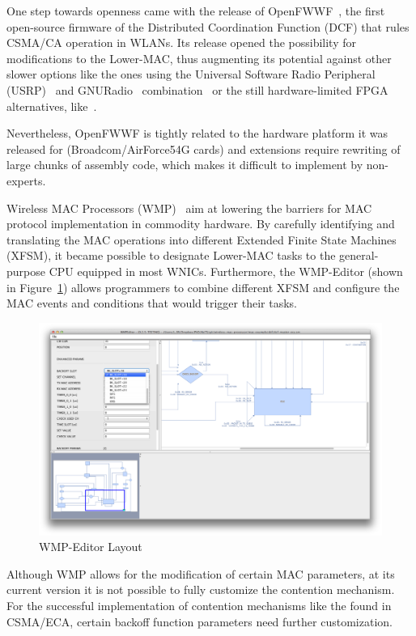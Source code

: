 One step towards openness came with the release of OpenFWWF~\cite{OpenFWWF}, the first open-source firmware of the Distributed Coordination Function (DCF) that rules CSMA/CA operation in WLANs. Its release opened the possibility for modifications to the Lower-MAC, thus augmenting its potential against other slower options like the ones using the Universal Software Radio Peripheral (USRP)~\cite{ettus2008universal} and GNURadio~\cite{blossom2004gnu} combination~\cite{tan2011sora} or the still hardware-limited FPGA alternatives, like~\cite{ng2010airblue}.

Nevertheless, OpenFWWF is tightly related to the hardware platform it was released for (Broadcom/AirForce54G cards) and extensions require rewriting of large chunks of assembly code, which makes it difficult to implement by non-experts.

Wireless MAC Processors (WMP)~\cite{WMP} aim at lowering the barriers for MAC protocol implementation in commodity hardware. By carefully identifying and translating the MAC operations into different Extended Finite State Machines (XFSM), it became possible to designate Lower-MAC tasks to the general-purpose CPU equipped in most WNICs. Furthermore, the WMP-Editor (shown in Figure~\ref{fig:WMPEditor}) allows programmers to combine different XFSM and configure the MAC events and conditions that would trigger their tasks.


\begin{figure}[htbp]
  \centering
  \includegraphics[width=\linewidth]{WMP-EditorLayout.eps}
  \caption{WMP-Editor Layout
  \label{fig:WMPEditor}}
\end{figure}

Although WMP allows for the modification of certain MAC parameters, at its current version it is not possible to fully customize the contention mechanism. For the successful implementation of contention mechanisms like the found in CSMA/ECA, certain backoff function parameters need further customization.